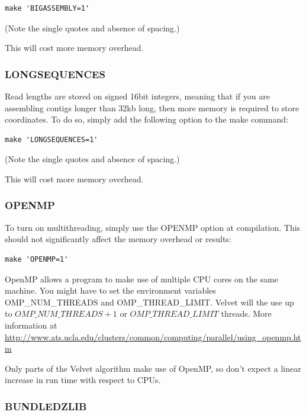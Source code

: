 \documentclass{article}
\begin{document}
\begin{verbatim}
make 'BIGASSEMBLY=1'
\end{verbatim}

(Note the single quotes and absence of spacing.)

This will cost more memory overhead. 

\subsubsection{LONGSEQUENCES}

Read lengths are stored on signed 16bit integers, meaning that if you are assembling contigs longer than 32kb long, then more memory is required to store coordinates. To do so, simply add the following option to the make command: 

\begin{verbatim}
make 'LONGSEQUENCES=1'
\end{verbatim}

(Note the single quotes and absence of spacing.)

This will cost more memory overhead. 

\subsubsection{OPENMP}

To turn on multithreading, simply use the OPENMP option at compilation. This should not significantly affect the memory overhead or results: 

\begin{verbatim}
make 'OPENMP=1'
\end{verbatim}

OpenMP allows a program to make use of multiple CPU cores on the same machine. You might have to set the environment variables OMP\_NUM\_THREADS and OMP\_THREAD\_LIMIT. Velvet will the use up to $OMP\_NUM\_THREADS + 1$ or $OMP\_THREAD\_LIMIT$ threads. More information at \\
\href{ http://www.ats.ucla.edu/clusters/common/computing/parallel/using_openmp.htm}{http://www.ats.ucla.edu/clusters/common/computing/parallel/using\_openmp.htm}

Only parts of the Velvet algorithm make use of OpenMP, so don't expect a linear increase in run time with respect to CPUs.

\subsubsection{BUNDLEDZLIB}
\end{document}

